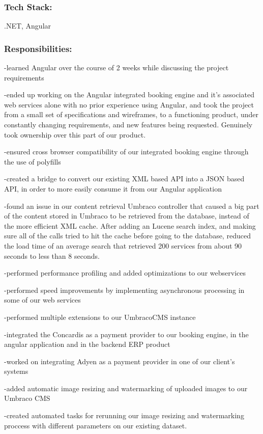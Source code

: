 \documentclass[a4paper,hidelinks,11pt]{article}
\begin{document}
\subsubsection{Tech Stack:} .NET, Angular
\subsubsection{Responsibilities:}
-learned Angular over the course of 2 weeks while discussing the project requirements

-ended up working on the Angular integrated booking engine and it's associated web services alone with no prior experience using Angular, and took the project from a small set of specifications and wireframes, to a functioning product, under constantly changing requirements, and new features being requested. Genuinely took ownership over this part of our product.

-ensured cross browser compatibility of our integrated booking engine through the use of polyfills

-created a bridge to convert our existing XML based API into a JSON based API, in order to more easily consume it from our Angular application

-found an issue in our content retrieval Umbraco controller that caused a big part of the content stored in Umbraco to be retrieved from the database, instead of the more efficient XML cache. After adding an Lucene search index, and making sure all of the calls tried to hit the cache before going to the database, reduced the load time of an average search that retrieved 200 services from about 90 seconds to less than 8 seconds.

-performed performance profiling and added optimizations to our webservices

-performed speed improvements by implementing asynchronous processing in some of our web services

-performed multiple extensions to our UmbracoCMS instance

-integrated the Concardis as a payment provider to our booking engine, in the angular application and in the backend ERP product

-worked on integrating Adyen as a payment provider in one of our client's systems

-added automatic image resizing and watermarking of uploaded images to our Umbraco CMS

-created automated tasks for rerunning our image resizing and watermarking proccess with different parameters on our existing dataset.
\end{document}
